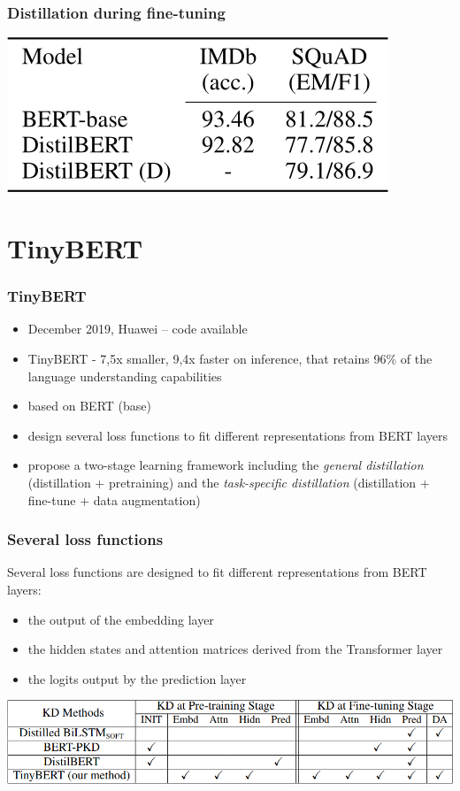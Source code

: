 \documentclass{beamer}
\begin{document}
\begin{frame}
    \frametitle{Distillation during fine-tuning}
    \begin{center}
        \includegraphics[scale=0.36]{img/distillation_distillation_fine_tune.png}
    \end{center}
\end{frame}



\section{TinyBERT}
\begin{frame}
    \frametitle{TinyBERT \cite{tiny_bert}}
    \begin{itemize}
        \item December 2019, Huawei -- code available
        \item TinyBERT - 7,5x smaller, 9,4x faster on inference, that retains 96\% of the language understanding capabilities
        \item based on BERT (base)
        \item design several loss functions to fit different representations from BERT layers
        \item propose a two-stage learning framework including the \textit{general distillation} (distillation + pretraining) and the \textit{task-specific distillation} (distillation + fine-tune + data augmentation)
    \end{itemize}
\end{frame}

\begin{frame}
    \frametitle{Several loss functions}
    Several loss functions are designed to fit different representations from BERT layers:
    \begin{itemize}
        \item the output of the embedding layer
        \item the hidden states and attention matrices derived from the Transformer layer
        \item the logits output by the prediction layer
    \end{itemize}
    \begin{center}
        \includegraphics[scale=0.365]{img/tiny_bert_summary.png}
    \end{center}
\end{frame}
\end{document}

